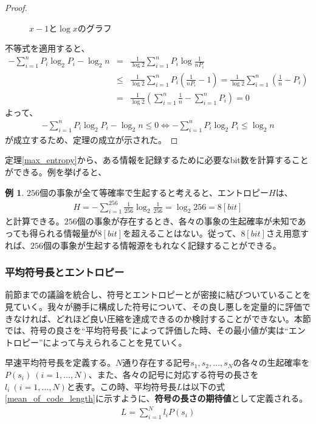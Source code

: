\documentclass[uplatex,dvipdfmx,b5j,10pt]{jsbook}
\theoremstyle{definition}
\newtheorem{example}[theorem]{例}
\begin{document}
\begin{proof}
\begin{figure}[htbp]
\begin{center}
      \caption{$x - 1$と$\log x$のグラフ} \label{xandlogx}
    \end{center}
  \end{figure}
  不等式を適用すると、
  \begin{eqnarray*}
    -\sum_{i = 1}^{n} P_{i} \log_{2} P_{i} - \log_{2} n &=& \frac{1}{\log 2} \sum_{i = 1}^{n} P_{i} \log \frac{1}{n P_{i}} \\
    &\leq& \frac{1}{\log 2} \sum_{i = 1}^{n} P_{i} \left( \frac{1}{n P_{i}} - 1 \right) = \frac{1}{\log 2} \sum_{i = 1}^{n} \left( \frac{1}{n} - P_{i} \right) \\
    &=& \frac{1}{\log 2} \left( \sum_{i = 1}^{n} \frac{1}{n} - \sum_{i = 1}^{n} P_{i} \right) = 0
  \end{eqnarray*}
  よって、
  \begin{eqnarray*}
    -\sum_{i = 1}^{n} P_{i} \log_{2} P_{i} - \log_{2} n \leq 0 \iff -\sum_{i = 1}^{n} P_{i} \log_{2} P_{i} \leq \log_{2} n 
  \end{eqnarray*}
  が成立するため、定理の成立が示された。
\end{proof}

定理\ref{max_entropy}から、ある情報を記録するために必要なbit数を計算することができる。例を挙げると、
\begin{example}
  $256$個の事象が全て等確率で生起すると考えると、エントロピー$H$は、
  \begin{eqnarray*}
    H = -\sum_{i = 1}^{256} \frac{1}{256} \log_{2} \frac{1}{256} = \log_{2} 256 = 8 [bit]
  \end{eqnarray*}
  と計算できる。$256$個の事象が存在するとき、各々の事象の生起確率が未知であっても得られる情報量が$8[bit]$を超えることはない。従って、$8[bit]$さえ用意すれば、$256$個の事象が生起する情報源をもれなく記録することができる。
\end{example}

\subsubsection{平均符号長とエントロピー}

前節までの議論を統合し、符号とエントロピーとが密接に結びついていることを見ていく。我々が勝手に構成した符号について、その良し悪しを定量的に評価できなければ、どれほど良い圧縮を達成できるのか検討することができない。本節では、符号の良さを``平均符号長''によって評価した時、その最小値が実は``エントロピー''によって与えられることを見ていく。

早速平均符号長を定義する。$N$通り存在する記号$s_{1}, s_{2}, \dots, s_{N}$の各々の生起確率を$P(s_{i})\ (i = 1,\dots,N)$、また、各々の記号に対応する符号の長さを$l_{i}\ (i = 1,\dots,N)$と表す。この時、平均符号長$L$は以下の式\ref{mean_of_code_length}に示すように、\textbf{符号の長さの期待値}として定義される。
\begin{eqnarray} \label{mean_of_code_length}
  L = \sum_{i = 1}^{N} l_{i} P(s_{i})
\end{eqnarray}
\end{document}
